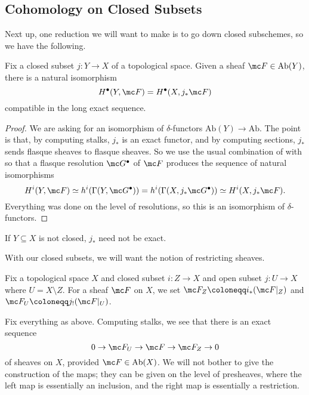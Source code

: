 \documentclass[../notes.tex]{subfiles}
\begin{document}
\subsection{Cohomology on Closed Subsets}
Next up, one reduction we will want to make is to go down closed subschemes, so we have the following.
\begin{lemma} \label{lem:closed-cohomology}
	Fix a closed subset $j\colon Y\to X$ of a topological space. Given a sheaf $\mc F\in\mathrm{Ab}(Y)$, there is a natural isomorphism
	\[H^\bullet(Y,\mc F)=H^\bullet(X,j_*\mc F)\]
	compatible in the long exact sequence.
\end{lemma}
\begin{proof}
	We are asking for an isomorphism of $\delta$-functors $\mathrm{Ab}(Y)\to\mathrm{Ab}$. The point is that, by computing stalks, $j_*$ is an exact functor, and by computing sections, $j_*$ sends flasque sheaves to flasque sheaves. So we use the usual combination of  with  so that a flasque resolution $\mc G^\bullet$ of $\mc F$ produces the sequence of natural isomorphisms
	\[H^i(Y,\mc F)\simeq h^i(\Gamma(Y,\mc G^\bullet))=h^i(\Gamma(X,j_*\mc G^\bullet))\simeq H^i(X,j_*\mc F).\]
	Everything was done on the level of resolutions, so this is an isomorphism of $\delta$-functors.
\end{proof}
\begin{remark}
	If $Y\subseteq X$ is not closed, $j_*$ need not be exact.
\end{remark}
With our closed subsets, we will want the notion of restricting sheaves.
\begin{definition}
	Fix a topological space $X$ and closed subset $i\colon Z\to X$ and open subset $j\colon U\to X$ where $U=X\setminus Z$. For a sheaf $\mc F$ on $X$, we set $\mc F_Z\coloneqq i_*(\mc F|_Z)$ and $\mc F_U\coloneqq j_!(\mc F|_U)$.
\end{definition}
\begin{remark} \label{rem:ses-res-sheaf}
	Fix everything as above. Computing stalks, we see that there is an exact sequence
	\[0\to\mc F_U\to\mc F\to\mc F_Z\to0\]
	of sheaves on $X$, provided $\mc F\in\mathrm{Ab}(X)$. We will not bother to give the construction of the maps; they can be given on the level of presheaves, where the left map is essentially an inclusion, and the right map is essentially a restriction.
\end{remark}
\end{document}
